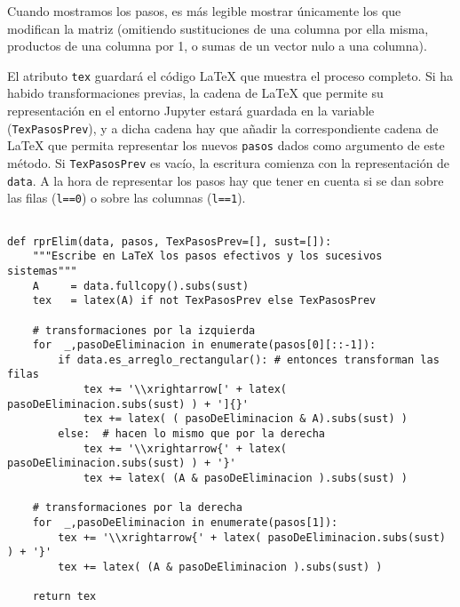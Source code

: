 \documentclass[11pt]{report}
\begin{document}
Cuando mostramos los pasos, es más legible mostrar únicamente los
que modifican la matriz (omitiendo sustituciones de una columna por
ella misma, productos de una columna por 1, o sumas de un vector nulo
a una columna). 

El atributo \texttt{tex} guardará el código \LaTeX{} que muestra el proceso
completo. Si ha habido transformaciones previas, la cadena de \LaTeX{}
que permite su representación en el entorno Jupyter estará guardada en
la variable (\texttt{TexPasosPrev}), y a dicha cadena hay que añadir la
correspondiente cadena de \LaTeX{} que permita representar los nuevos \texttt{pasos} dados como argumento de este método. Si \texttt{TexPasosPrev} es
vacío, la escritura comienza con la representación de \texttt{data}. A la
hora de representar los pasos hay que tener en cuenta si se dan sobre
las filas (\texttt{l==0}) o sobre las columnas (\texttt{l==1}). 

\begin{verbatim}

def rprElim(data, pasos, TexPasosPrev=[], sust=[]):
    """Escribe en LaTeX los pasos efectivos y los sucesivos sistemas"""
    A     = data.fullcopy().subs(sust)
    tex   = latex(A) if not TexPasosPrev else TexPasosPrev
    
    # transformaciones por la izquierda
    for  _,pasoDeEliminacion in enumerate(pasos[0][::-1]):
        if data.es_arreglo_rectangular(): # entonces transforman las filas
            tex += '\\xrightarrow[' + latex( pasoDeEliminacion.subs(sust) ) + ']{}' 
            tex += latex( ( pasoDeEliminacion & A).subs(sust) )
        else:  # hacen lo mismo que por la derecha
            tex += '\\xrightarrow{' + latex( pasoDeEliminacion.subs(sust) ) + '}'
            tex += latex( (A & pasoDeEliminacion ).subs(sust) )
        
    # transformaciones por la derecha
    for  _,pasoDeEliminacion in enumerate(pasos[1]):
        tex += '\\xrightarrow{' + latex( pasoDeEliminacion.subs(sust) ) + '}'
        tex += latex( (A & pasoDeEliminacion ).subs(sust) )
                
    return tex

\end{verbatim}
\end{document}
